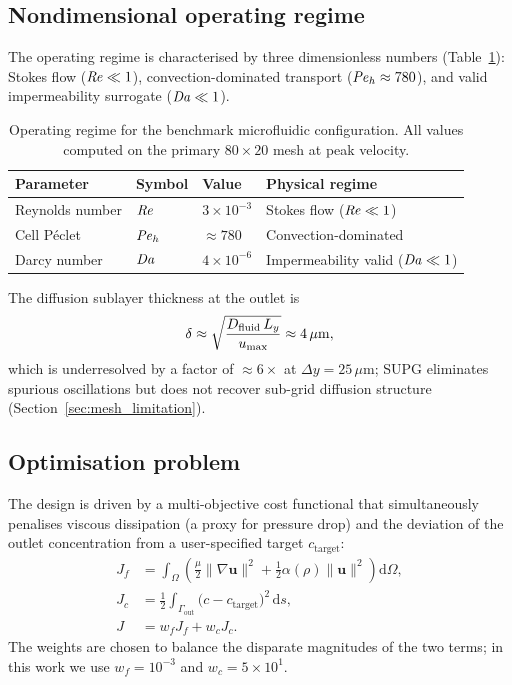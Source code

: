 \subsection{Nondimensional operating regime}
\label{sec:nondim}
The operating regime is characterised by three dimensionless
numbers (Table~\ref{tab:regime}): Stokes flow ($\mathit{Re}\ll1$),
convection-dominated transport ($\mathit{Pe}_h\approx780$), and
valid impermeability surrogate ($\mathit{Da}\ll1$).

\begin{table}[h]
\centering\small
\caption{Operating regime for the benchmark microfluidic configuration.
         All values computed on the primary $80\times20$ mesh at peak velocity.}
\label{tab:regime}
\begin{tabular}{@{}llll@{}}
\toprule
Parameter & Symbol & Value & Physical regime \\
\midrule
Reynolds number & $\mathit{Re}$ & $3\times10^{-3}$ & Stokes flow ($\mathit{Re}\ll1$) \\
Cell P\'{e}clet & $\mathit{Pe}_h$ & $\approx780$ & Convection-dominated \\
Darcy number & $\mathit{Da}$ & $4\times10^{-6}$ & Impermeability valid ($\mathit{Da}\ll1$) \\
\bottomrule
\end{tabular}
\end{table}

The diffusion sublayer thickness at the outlet is
\begin{equation}
  \delta \approx \sqrt{\frac{D_{\rm fluid}\,L_y}{u_{\rm max}}} \approx 4\,\mu{\rm m},
  \label{eq:delta}
\end{equation}
which is underresolved by a factor of $\approx6\times$ at
$\Delta y=25\,\mu$m; SUPG eliminates spurious oscillations
but does not recover sub-grid diffusion structure
(Section~\ref{sec:mesh_limitation}).

\subsection{Optimisation problem}
The design is driven by a multi-objective cost functional that simultaneously penalises viscous dissipation (a proxy for pressure drop) and the deviation of the outlet concentration from a user-specified target \(c_{\text{target}}\):
\begin{subequations}
\label{eq:objective}
\begin{align}
    J_f &= \int_{\Omega} \left( \frac{\mu}{2}\|\nabla\mathbf{u}\|^2 + \frac12 \alpha(\rho)\|\mathbf{u}\|^2 \right) \mathrm{d}\Omega, \label{eq:Jf} \\
    J_c &= \frac12 \int_{\Gamma_{\text{out}}} \bigl(c - c_{\text{target}}\bigr)^2 \,\mathrm{d}s, \label{eq:Jc} \\
    J   &= w_f J_f + w_c J_c. \label{eq:J}
\end{align}
\end{subequations}
The weights are chosen to balance the disparate magnitudes of the two terms; in this work we use \(w_f = 10^{-3}\) and \(w_c = 5\times 10^{1}\).

